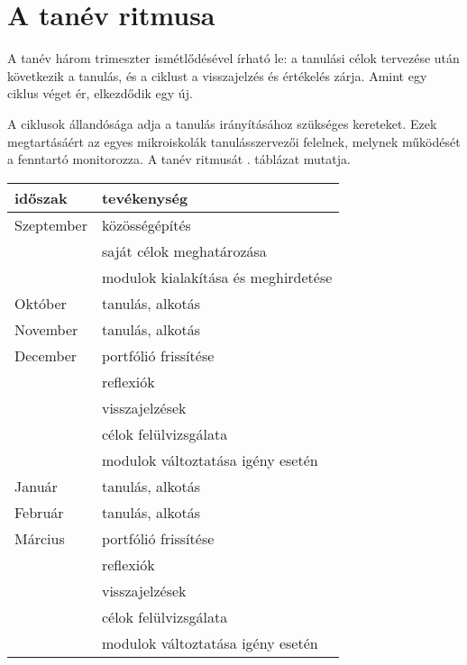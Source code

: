 \section{A tanév ritmusa}

A tanév három trimeszter ismétlődésével írható le: a tanulási célok
tervezése után következik a tanulás, és a ciklust a visszajelzés és értékelés
zárja.	Amint egy ciklus véget ér, elkezdődik egy új.

A ciklusok állandósága adja a tanulás irányításához szükséges kereteket. Ezek
megtartásáért az egyes mikroiskolák tanulásszervezői felelnek, melynek működését a
fenntartó monitorozza. A tanév ritmusát . táblázat
mutatja.

\begin{table}
  \centering
  \begin{tabular}{ l|l }
    \textbf{időszak} & \textbf{tevékenység}                \\
    \hline
    Szeptember       &
    közösségépítés                                         \\
                     & saját célok meghatározása           \\
                     & modulok kialakítása és meghirdetése
    \\ \hline

    Október          &
    tanulás, alkotás
    \\ \hline

    November         &
    tanulás, alkotás
    \\ \hline

    December         &
    portfólió frissítése                                   \\
                     & reflexiók                           \\
                     & visszajelzések                      \\
                     & célok felülvizsgálata               \\
                     & modulok változtatása igény esetén
    \\ \hline

    Január           &
    tanulás, alkotás
    \\ \hline

    Február          &
    tanulás, alkotás
    \\ \hline

    Március          &
    portfólió frissítése                                   \\
                     & reflexiók                           \\
                     & visszajelzések                      \\
                     & célok felülvizsgálata               \\
                     & modulok változtatása igény esetén
    \\ \hline


\end{tabular}
\end{table}
